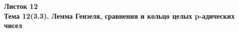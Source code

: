 \documentclass[a4paper, 11pt]{article}
\begin{document}
\begin{center} \Large \bf Листок 12\\ Тема 12(3.3). Лемма Гензеля, сравнения и кольцо целых p-адических чисел \end{center}


\end{document}
